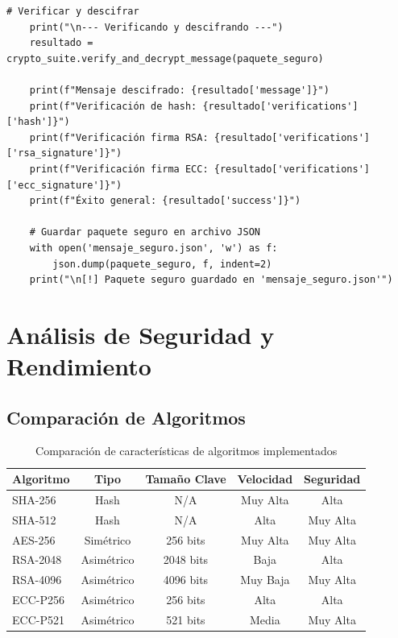 \documentclass[12pt,a4paper]{article}
\begin{document}
\begin{lstlisting}[caption=Suite completa de cifrado integrando todas las funcionalidades]
    # Verificar y descifrar
    print("\n--- Verificando y descifrando ---")
    resultado = crypto_suite.verify_and_decrypt_message(paquete_seguro)
    
    print(f"Mensaje descifrado: {resultado['message']}")
    print(f"Verificación de hash: {resultado['verifications']['hash']}")
    print(f"Verificación firma RSA: {resultado['verifications']['rsa_signature']}")
    print(f"Verificación firma ECC: {resultado['verifications']['ecc_signature']}")
    print(f"Éxito general: {resultado['success']}")
    
    # Guardar paquete seguro en archivo JSON
    with open('mensaje_seguro.json', 'w') as f:
        json.dump(paquete_seguro, f, indent=2)
    print("\n[!] Paquete seguro guardado en 'mensaje_seguro.json'")
\end{lstlisting}

\newpage

\section{Análisis de Seguridad y Rendimiento}

\subsection{Comparación de Algoritmos}

\begin{table}[h]
    \centering
    \caption{Comparación de características de algoritmos implementados}
    \begin{tabular}{|l|c|c|c|c|}
        \hline
        \textbf{Algoritmo} & \textbf{Tipo} & \textbf{Tamaño Clave} & \textbf{Velocidad} & \textbf{Seguridad} \\
        \hline
        SHA-256            & Hash          & N/A                   & Muy Alta           & Alta               \\
        SHA-512            & Hash          & N/A                   & Alta               & Muy Alta           \\
        AES-256            & Simétrico     & 256 bits              & Muy Alta           & Muy Alta           \\
        RSA-2048           & Asimétrico    & 2048 bits             & Baja               & Alta               \\
        RSA-4096           & Asimétrico    & 4096 bits             & Muy Baja           & Muy Alta           \\
        ECC-P256           & Asimétrico    & 256 bits              & Alta               & Alta               \\
        ECC-P521           & Asimétrico    & 521 bits              & Media              & Muy Alta           \\
        \hline
    \end{tabular}
\end{table}
\end{document}
